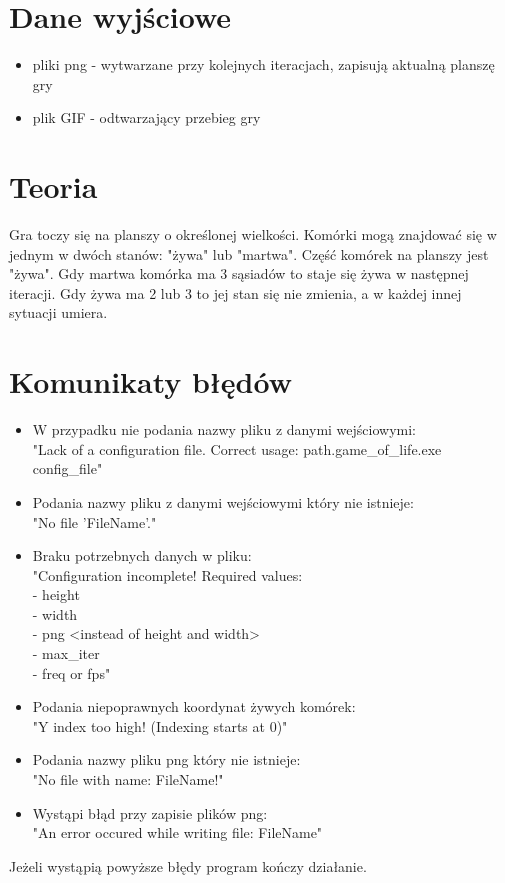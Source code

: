 \documentclass[12pt]{article}
\begin{document}
\section{Dane wyjściowe}

\begin{itemize}
	\item pliki png - wytwarzane przy kolejnych iteracjach, zapisują aktualną planszę gry
	\item plik GIF - odtwarzający przebieg gry
\end{itemize}


\section{Teoria}

Gra toczy się na planszy o określonej wielkości. Komórki mogą znajdować się w jednym w dwóch stanów: "żywa" lub "martwa". Część komórek na planszy jest "żywa". Gdy martwa komórka ma 3 sąsiadów to staje się żywa w następnej iteracji. Gdy żywa ma 2 lub 3 to jej stan się nie zmienia, a w każdej innej sytuacji umiera.


\section{Komunikaty błędów}

\begin{itemize}
	\item W przypadku nie podania nazwy pliku z danymi wejściowymi:\\
	      "Lack of a configuration file.
	      Correct usage: path.game\_of\_life.exe config\_file"

	\item Podania nazwy pliku z danymi wejściowymi który 
	nie istnieje:\\
	      "No file 'FileName'."

	\item Braku potrzebnych danych w pliku:\\
	      "Configuration incomplete! Required values:\\
	      - height\\
	      - width\\
	      - png \textless{}instead of height and width\textgreater{}\\
	      - max\_iter\\
	      - freq or fps"
	
	\item Podania niepoprawnych koordynat żywych komórek:\\
	      "Y index too high! (Indexing starts at 0)"
	      
	\item Podania nazwy pliku png który nie istnieje:\\
		  "No file with name: FileName!"
		  
	\item Wystąpi błąd przy zapisie plików png:\\
		  "An error occured while writing file: FileName"

\end{itemize}
Jeżeli wystąpią powyższe błędy program kończy działanie.
\end{document}
